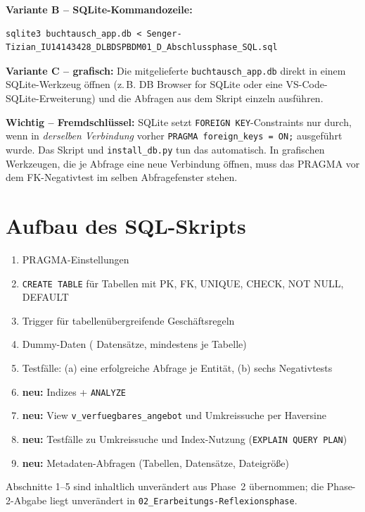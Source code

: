 \documentclass[11pt,a4paper]{article}
\begin{document}
\textbf{Variante B -- SQLite-Kommandozeile:}
\begin{lstlisting}[style=shell]
sqlite3 buchtausch_app.db < Senger-Tizian_IU14143428_DLBDSPBDM01_D_Abschlussphase_SQL.sql
\end{lstlisting}

\textbf{Variante C -- grafisch:} Die mitgelieferte \texttt{buchtausch\_app.db} direkt in einem SQLite-Werkzeug öffnen (z.\,B. DB Browser for SQLite oder eine VS-Code-SQLite-Erweiterung) und die Abfragen aus dem Skript einzeln ausführen.

\textbf{Wichtig -- Fremdschlüssel:} SQLite setzt \texttt{FOREIGN KEY}-Constraints nur durch, wenn in \emph{derselben Verbindung} vorher \texttt{PRAGMA foreign\_keys = ON;} ausgeführt wurde. Das Skript und \texttt{install\_db.py} tun das automatisch. In grafischen Werkzeugen, die je Abfrage eine neue Verbindung öffnen, muss das PRAGMA vor dem FK-Negativtest im selben Abfragefenster stehen.

\section{Aufbau des SQL-Skripts}
\begin{enumerate}
  \item PRAGMA-Einstellungen
  \item \texttt{CREATE TABLE} für \mdTabellen{} Tabellen mit PK, FK, UNIQUE, CHECK, NOT NULL, DEFAULT
  \item \mdTrigger{} Trigger für tabellenübergreifende Geschäftsregeln
  \item Dummy-Daten (\mdDatensaetze{} Datensätze, mindestens \mdMinZeilen{} je Tabelle)
  \item Testfälle: (a) eine erfolgreiche Abfrage je Entität, (b) sechs Negativtests
  \item \textbf{neu:} \mdIndizes{} Indizes + \texttt{ANALYZE}
  \item \textbf{neu:} View \texttt{v\_verfuegbares\_angebot} und Umkreissuche per Haversine
  \item \textbf{neu:} Testfälle zu Umkreissuche und Index-Nutzung (\texttt{EXPLAIN QUERY PLAN})
  \item \textbf{neu:} Metadaten-Abfragen (Tabellen, Datensätze, Dateigröße)
\end{enumerate}
Abschnitte 1--5 sind inhaltlich unverändert aus Phase~2 übernommen; die Phase-2-Abgabe liegt unverändert in \texttt{02\_Erarbeitungs-Reflexionsphase}.
\end{document}
